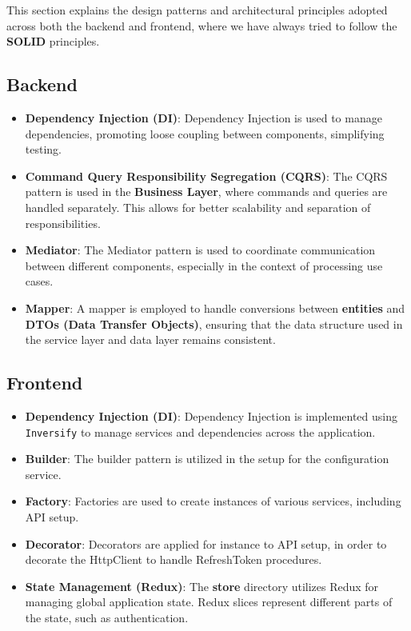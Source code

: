 This section explains the design patterns and architectural principles adopted across both the backend and frontend, where we have always tried to follow the \textbf{SOLID} principles.

\subsection{Backend}

\begin{itemize}
    \item \textbf{Dependency Injection (DI)}: Dependency Injection is used to manage dependencies, promoting loose coupling between components, simplifying testing.
    
    \item \textbf{Command Query Responsibility Segregation (CQRS)}: The CQRS pattern is used in the \textbf{Business Layer}, where commands and queries are handled separately. This allows for better scalability and separation of responsibilities.

    \item \textbf{Mediator}: The Mediator pattern is used to coordinate communication between different components, especially in the context of processing use cases.

    \item \textbf{Mapper}: A mapper is employed to handle conversions between \textbf{entities} and \textbf{DTOs (Data Transfer Objects)}, ensuring that the data structure used in the service layer and data layer remains consistent.
\end{itemize}

\subsection{Frontend}
\begin{itemize}
    \item \textbf{Dependency Injection (DI)}: Dependency Injection is implemented using \texttt{Inversify} to manage services and dependencies across the application.

    \item \textbf{Builder}: The builder pattern is utilized in the setup for the configuration service.

    \item \textbf{Factory}: Factories are used to create instances of various services, including API setup.

    \item \textbf{Decorator}: Decorators are applied for instance to API setup, in order to decorate the HttpClient to handle RefreshToken procedures.

    \item \textbf{State Management (Redux)}: The \textbf{store} directory utilizes Redux for managing global application state. Redux slices represent different parts of the state, such as authentication.
\end{itemize}

